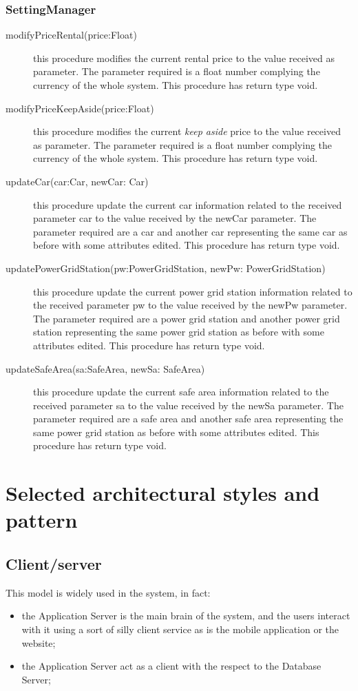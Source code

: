 \documentclass{scrreprt}
\begin{document}
\subsubsection{SettingManager}
\begin{description}
\item[modifyPriceRental(price:Float)] this procedure modifies the current rental price to the value received as parameter. The parameter required is a float number complying the currency of the whole system. This procedure has return type void.
\item[modifyPriceKeepAside(price:Float)] this procedure modifies the current \emph{keep aside} price to the value received as parameter. The parameter required is a float number complying the currency of the whole system. This procedure has return type void.
\item[updateCar(car:Car, newCar: Car)] this procedure update the current car information related to the received parameter car to the value received by the newCar parameter. The parameter required are a car and another car representing the same car as before with some attributes edited. This procedure has return type void.
\item[updatePowerGridStation(pw:PowerGridStation, newPw: PowerGridStation)] this procedure update the current power grid station information related to the received parameter pw to the value received by the newPw parameter. The parameter required are a power grid station and another power grid station representing the same power grid station as before with some attributes edited. This procedure has return type void.
\item[updateSafeArea(sa:SafeArea, newSa: SafeArea)] this procedure update the current safe area information related to the received parameter sa to the value received by the newSa parameter. The parameter required are a safe area and another safe area representing the same power grid station as before with some attributes edited. This procedure has return type void.
\end{description}

\section{Selected architectural styles and pattern}
\subsection{Client/server}
This model is widely used in the system, in fact:
\begin{itemize}
\item the Application Server is the main brain of the system, and the users interact with it using a sort of silly client service as is the mobile application or the website;
\item the Application Server act as a client with the respect to the Database Server;
\end{itemize}
\end{document}
